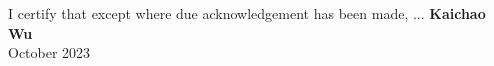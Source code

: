 \cleardoublepage
{}

\begin{dedication}
  I certify that except where due acknowledgement has been made, ...
  \textbf{Kaichao Wu}\\
  October 2023
\clearpage
\end{dedication}